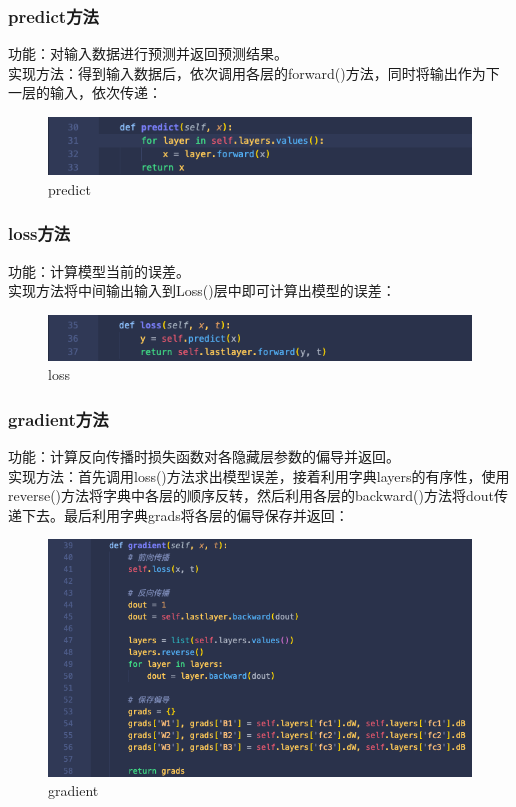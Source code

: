 \documentclass{article}
\begin{document}
\subsubsection{predict方法}
功能：对输入数据进行预测并返回预测结果。\\
实现方法：得到输入数据后，依次调用各层的forward()方法，同时将输出作为下一层的输入，依次传递：
\begin{figure}[H]
	\centering
	\includegraphics[scale=0.6]{predict.png}
	\caption{predict}
\end{figure}

\subsubsection{loss方法}
功能：计算模型当前的误差。\\
实现方法将中间输出输入到Loss()层中即可计算出模型的误差：
\begin{figure}[H]
	\centering
	\includegraphics[scale=0.6]{loss.png}
	\caption{loss}
\end{figure}

\subsubsection{gradient方法}
功能：计算反向传播时损失函数对各隐藏层参数的偏导并返回。\\
实现方法：首先调用loss()方法求出模型误差，接着利用字典layers的有序性，使用reverse()方法将字典中各层的顺序反转，然后利用各层的backward()方法将dout传递下去。最后利用字典grads将各层的偏导保存并返回：
\begin{figure}[H]
	\centering
	\includegraphics[scale=0.6]{gradient.png}
	\caption{gradient}
\end{figure}
\end{document}

